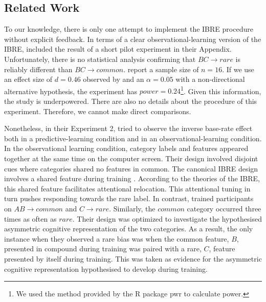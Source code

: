 \documentclass[10pt,letterpaper]{article}
\begin{document}
\subsection{Related Work}

To our knowledge, there is only one attempt to implement the IBRE procedure without explicit feedback.
In terms of a clear observational-learning version of the IBRE,  included the result of a short pilot experiment in their Appendix.
Unfortunately, there is no statistical analysis confirming that $BC \to rare$ is reliably different than $BC \to common$.
 report a sample size of $n = 16$.
If we use an effect size of $d = 0.46$ observed by  and an $\alpha = 0.05$ with a non-directional alternative hypothesis, the experiment has $power = 0.24$\footnote{We used the method provided by the R package pwr \cite{champely2020pwr} to calculate power.}.
Given this information, the study is underpowered.
There are also no details about the procedure of this experiment.
Therefore, we cannot make direct comparisons.

Nonetheless, in their Experiment 2,  tried to observe the inverse base-rate effect both in a predictive-learning condition and in an observational-learning condition.
In the observational learning condition, category labels and features appeared together at the same time on the computer screen.
Their design involved disjoint cues where categories shared no features in common.
The canonical IBRE design involves a shared feature during training \cite{kruschke2001inverse, wills2014attention}.
According to the theories of the IBRE, this shared feature facilitates attentional relocation.
This attentional tuning in turn pushes responding towards the rare label.
In contrast,  trained participants on $AB \to common$ and $C \to rare$.
Similarly, the $common$ category occurred three times as often as $rare$.
Their design was optimized to investigate the hypothesised asymmetric cognitive representation of the two categories.
As a result, the only instance when they observed a rare bias was when the common feature, $B$, presented in compound during training was paired with a rare, $C$, feature presented by itself during training.
This was taken as evidence for the asymmetric cognitive representation \cite{kruschke2001inverse} hypothesised to develop during training.
\end{document}

